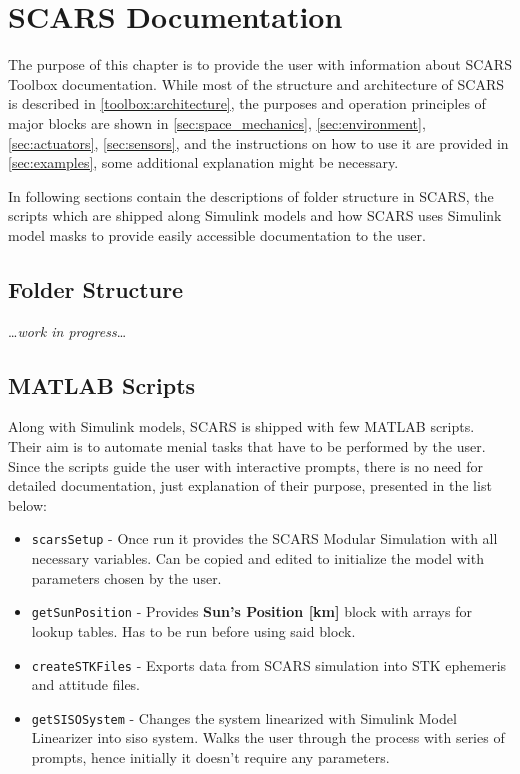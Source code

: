 \section{SCARS Documentation}\label{sec:documentation}
    The purpose of this chapter is to provide the user with information about SCARS Toolbox documentation. While most of the structure and architecture of SCARS is described in \autoref{toolbox:architecture}, the purposes and operation principles of major blocks are shown in \autoref{sec:space_mechanics}, \ref{sec:environment}, \ref{sec:actuators},  \ref{sec:sensors},   and the instructions on how to use it are provided in \autoref{sec:examples}, some additional explanation might be necessary. 
    
    In following sections contain the descriptions of folder structure in SCARS, the scripts which are shipped along Simulink models and how SCARS uses Simulink model masks to provide easily accessible documentation to the user.
    


    \subsection{Folder Structure}
        \dots\textit{work in progress}\dots
    


    \subsection{MATLAB Scripts}
        Along with Simulink models, SCARS is shipped with few MATLAB scripts. Their aim is to automate menial tasks that have to be performed by the user. Since the scripts guide the user with interactive prompts, there is no need for detailed documentation, just explanation of their purpose, presented in the list below:
        
        \begin{itemize}
            \item \verb|scarsSetup| - Once run it provides the SCARS Modular Simulation with all necessary variables. Can be copied and edited to initialize the model with parameters chosen by the user.
            \item \verb|getSunPosition| - Provides \textbf{Sun's Position [km]} block with arrays for lookup tables. Has to be run before using said block.
            \item \verb|createSTKFiles| - Exports data from SCARS simulation into STK ephemeris and attitude files.
            \item \verb|getSISOSystem| - Changes the system linearized with Simulink Model Linearizer into \ac{siso} system. Walks the user through the process with series of prompts, hence initially it doesn't require any parameters.
        \end{itemize}
        

